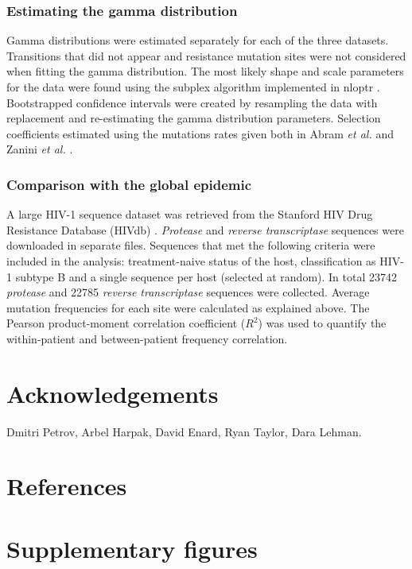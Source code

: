 \documentclass{article}
\begin{document}
\subsubsection*{Estimating the gamma distribution}
Gamma distributions were estimated separately for each of the three datasets. Transitions that did not appear and resistance mutation sites were not considered when fitting the gamma distribution. The most likely shape and scale parameters for the data were found using the subplex algorithm implemented in nloptr \cite{nloptr}. Bootstrapped confidence intervals were created by resampling the data with replacement and re-estimating the gamma distribution parameters. Selection coefficients estimated using the mutations rates given both in Abram \textit {et al.} \cite{abram2010nature} and Zanini \textit {et al.} \cite{zanini2016vivo}.


\subsubsection*{Comparison with the global epidemic}
A large HIV-1 sequence dataset was retrieved from the Stanford HIV Drug Resistance Database (HIVdb) \cite{rhee2003human}. \textit{Protease} and \textit{reverse transcriptase} sequences were downloaded in separate files. Sequences that met the following criteria were included in the analysis: treatment-naive status of the host, classification as HIV-1 subtype B and a single sequence per host (selected at random). In total 23742 \textit{protease} and 22785 \textit{reverse transcriptase} sequences were collected. Average mutation frequencies for each site were calculated as explained above. The Pearson product-moment correlation coefficient ($R^2$) was used to quantify the within-patient and between-patient frequency correlation. 

\section{Acknowledgements}
Dmitri Petrov, Arbel Harpak, David Enard, Ryan Taylor, Dara Lehman. 

\section{References}




\pagebreak
\section{Supplementary figures}
\end{document}
